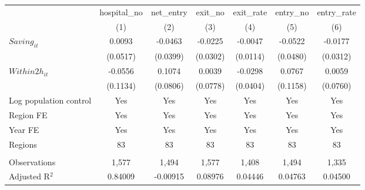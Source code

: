 \begingroup
\centering
\begin{tabular}{lcccccc}
   \toprule
                          & hospital\_no  & net\_entry  & exit\_no  & exit\_rate  & entry\_no  & entry\_rate \\    
                          & (1)           & (2)         & (3)       & (4)         & (5)        & (6)\\  
   \midrule 
   $Saving_{it}$          & 0.0093        & -0.0463     & -0.0225   & -0.0047     & -0.0522    & -0.0177\\   
                          & (0.0517)      & (0.0399)    & (0.0302)  & (0.0114)    & (0.0480)   & (0.0312)\\   
   $Within2h_{it}$        & -0.0556       & 0.1074      & 0.0039    & -0.0298     & 0.0767     & 0.0059\\   
                          & (0.1134)      & (0.0806)    & (0.0778)  & (0.0404)    & (0.1158)   & (0.0760)\\   
   Log population control & Yes           & Yes         & Yes       & Yes         & Yes        & Yes\\  
   Region FE              & Yes           & Yes         & Yes       & Yes         & Yes        & Yes\\  
   Year FE                & Yes           & Yes         & Yes       & Yes         & Yes        & Yes\\  
   Regions                & 83            & 83          & 83        & 83          & 83         & 83\\  
    \\
   Observations           & 1,577         & 1,494       & 1,577     & 1,408       & 1,494      & 1,335\\  
   Adjusted R$^2$         & 0.84009       & -0.00915    & 0.08976   & 0.04446     & 0.04763    & 0.04500\\  
   \bottomrule
\end{tabular}
\par\endgroup
